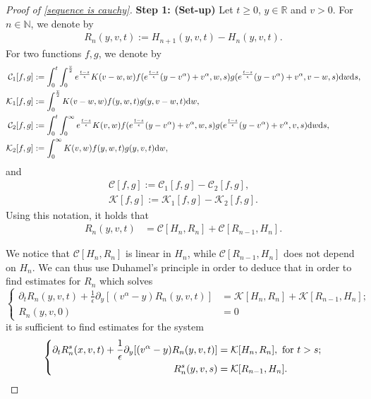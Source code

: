 \documentclass[11pt]{article}
\numberwithin{equation}{section}
\newcommand{\der}{\textup{d}}
\begin{document}
\begin{proof}[Proof of \eqref{sequence is cauchy}]

{\bf Step 1: (Set-up)}
Let $t\geq 0$, $y\in\mathbb{R}$ and $v> 0$. For $n\in\mathbb{N}$, we denote by 
\begin{align}\label{def rn}
R_n(y,v,t):=H_{n+1}(y,v,t)-H_n(y,v,t).
\end{align}
For two functions $f,g$, we denote by
\begin{align}
\mathcal{C}_{1}[f,g]&:=\int_{0}^{t}\int_{0}^{\frac{v}{2}}e^{\frac{t-s}{\epsilon}}K(v-w,w)f(e^{\frac{t-s}{\epsilon}}(y-v^{\alpha})+v^{\alpha},w,s)g(e^{\frac{t-s}{\epsilon}}(y-v^{\alpha})+v^{\alpha},v-w,s)\der w \der s,\label{k1 term}\\
\mathcal{K}_{1}[f,g]&:=\int_{0}^{\frac{v}{2}}K(v-w,w)f(y,w,t)g(y,v-w,t)\der w,\label{k1 term 2}\\
\mathcal{C}_{2}[f,g]&:=\int_{0}^{t}\int_{0}^{\infty}e^{\frac{t-s}{\epsilon}}K(v,w)f(e^{\frac{t-s}{\epsilon}}(y-v^{\alpha})+v^{\alpha},w,s)g(e^{\frac{t-s}{\epsilon}}(y-v^{\alpha})+v^{\alpha},v,s)\der w\der s,\label{k2 term}\\
\mathcal{K}_{2}[f,g]&:=\int_{0}^{\infty}K(v,w)f(y,w,t)g(y,v,t)\der w,\label{k2 term 2}
\end{align}
and
\begin{align}
\mathcal{C}[f,g]:=\mathcal{C}_{1}[f,g]-\mathcal{C}_{2}[f,g],\label{full k term}\\
\mathcal{K}[f,g]:=\mathcal{K}_{1}[f,g]-\mathcal{K}_{2}[f,g].\label{full k term 2}
\end{align}
Using this notation, it holds that
\begin{align}\label{induction step with distance one}
 R_n(y,v,t)&=\mathcal{C}[H_{n},R_n]+\mathcal{C}[R_{n-1},H_{n}].
\end{align}

We notice that $\mathcal{C}[H_{n},R_n]$ is linear in $H_{n}$, while $\mathcal{C}[R_{n-1},H_{n}]$ does not depend on $H_{n}$. We can thus use Duhamel's principle in order to deduce that in order to find estimates for $R_{n}$ which solves
\begin{equation}\label{duhamel 1}
\left\{\begin{aligned}
\partial_t R_n(y,v,t)+\frac{1}{\epsilon}\partial_y[(v^{\alpha}-y) R_n(y,v,t)]&=\mathcal{K}[H_{n},R_n]+\mathcal{K}[R_{n-1},H_{n}]; \\
R_{n}(y,v,0)&=0
   \end{aligned}\right.
   \end{equation}
   it is sufficient to find estimates for the system
    \begin{equation}\label{duhamel 2}
\left\{\begin{aligned}
\partial_t R^{s}_n(x,v,t)+\frac{1}{\epsilon}\partial_y[(v^{\alpha}-y) R_n(y,v,t)]&=\mathcal{K}[H_{n},R_n], \textup{ for } t>s; \\
R^{s}_{n}(y,v,s)&=\mathcal{K}[R_{n-1},H_{n}].
   \end{aligned}\right.
   \end{equation}



\end{proof}
\end{document}
